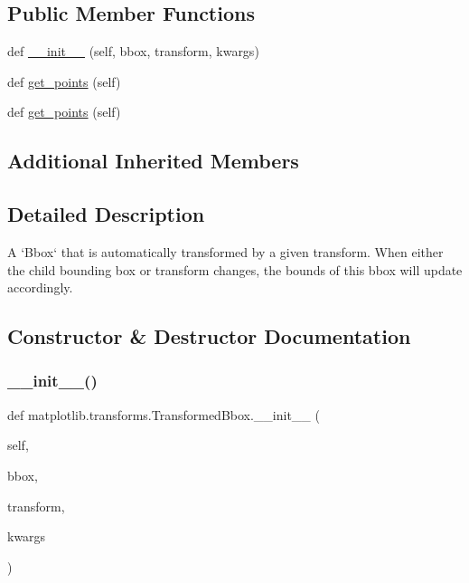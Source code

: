 \subsection*{Public Member Functions}
\begin{DoxyCompactItemize}
\item 
def \hyperlink{classmatplotlib_1_1transforms_1_1TransformedBbox_a1f52a90dc175d870258f96a77147574d}{\+\_\+\+\_\+init\+\_\+\+\_\+} (self, bbox, transform, kwargs)
\item 
def \hyperlink{classmatplotlib_1_1transforms_1_1TransformedBbox_afe8d0aadf2c8751caa2a4fedb9702307}{get\+\_\+points} (self)
\item 
def \hyperlink{classmatplotlib_1_1transforms_1_1TransformedBbox_afe8d0aadf2c8751caa2a4fedb9702307}{get\+\_\+points} (self)
\end{DoxyCompactItemize}
\subsection*{Additional Inherited Members}


\subsection{Detailed Description}
\begin{DoxyVerb}A `Bbox` that is automatically transformed by a given
transform.  When either the child bounding box or transform
changes, the bounds of this bbox will update accordingly.
\end{DoxyVerb}
 

\subsection{Constructor \& Destructor Documentation}
\mbox{\label{classmatplotlib_1_1transforms_1_1TransformedBbox_a1f52a90dc175d870258f96a77147574d}} 
\subsubsection{\texorpdfstring{\+\_\+\+\_\+init\+\_\+\+\_\+()}{\_\_init\_\_()}}
{\footnotesize\ttfamily def matplotlib.\+transforms.\+Transformed\+Bbox.\+\_\+\+\_\+init\+\_\+\+\_\+ (\begin{DoxyParamCaption}\item[{}]{self,  }\item[{}]{bbox,  }\item[{}]{transform,  }\item[{}]{kwargs }\end{DoxyParamCaption})}

